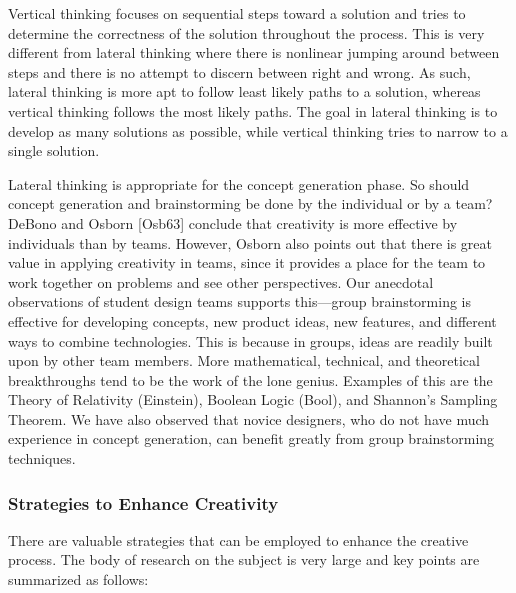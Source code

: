Vertical thinking focuses on sequential steps toward a solution and
tries to determine the correctness of the solution throughout the
process. This is very different from lateral thinking where there is
nonlinear jumping around between steps and there is no attempt to
discern be­tween right and wrong. As such, lateral thinking is more apt
to follow least likely paths to a solution, whereas vertical thinking
follows the most likely paths. The goal in lateral thinking is to
develop as many solutions as possible, while vertical thinking tries to
narrow to a single solution.

Lateral thinking is appropriate for the concept generation phase. So
should concept gen­eration and brainstorming be done by the individual or
by a team? DeBono and Osborn {[}Osb63{]} conclude that creativity is
more effective by individuals than by teams. However, Osborn also points
out that there is great value in applying creativity in teams, since it
provides a place for the team to work together on problems and see other
perspectives. Our anecdotal observations of student design teams
supports this---group brainstorming is effective for developing
concepts, new product ideas, new features, and different ways to combine
technologies. This is because in groups, ideas are readily built upon by
other team members. More mathe­matical, technical, and theoretical
breakthroughs tend to be the work of the lone genius. Ex­amples of this
are the Theory of Relativity (Einstein), Boolean Logic (Bool), and
Shannon's Sampling Theorem. We have also observed that novice designers,
who do not have much experience in concept generation, can benefit
greatly from group brainstorming techniques.

\subsubsection{Strategies to Enhance
Creativity}\label{strategies-to-enhance-creativity}

There are valuable strategies that can be employed to enhance the
creative process. The body of research on the subject is very large and
key points are summarized as follows:

